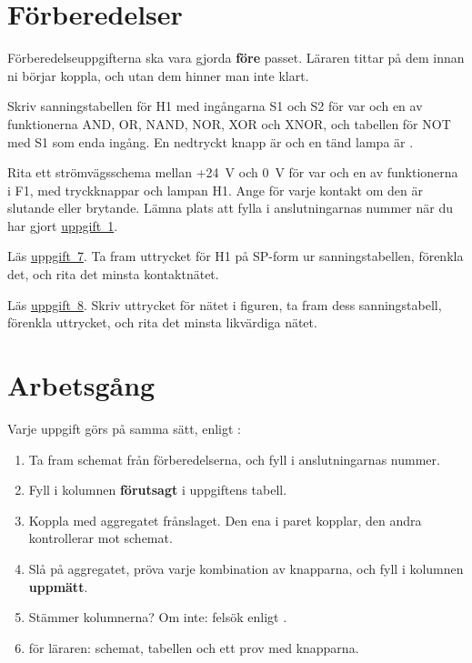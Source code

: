 \section{Förberedelser}
\label{lab1:sec:prep}
Förberedelseuppgifterna ska vara gjorda \textbf{före} passet. Läraren tittar på dem innan ni börjar
koppla, och utan dem hinner man inte klart.

Skriv sanningstabellen för H1 med ingångarna S1 och S2 för var och en av
funktionerna AND, OR, NAND, NOR, XOR och XNOR, och tabellen för NOT med S1 som enda ingång. En
nedtryckt knapp är  och en tänd lampa är .

Rita ett strömvägsschema mellan +24~V och 0~V för var och en av funktionerna
i F1, med tryckknappar och lampan H1. Ange för varje kontakt om den är slutande eller brytande.
Lämna plats att fylla i anslutningarnas nummer när du har gjort \hyperref[lab1:u1]{uppgift~1}.

Läs \hyperref[lab1:u7]{uppgift~7}. Ta fram uttrycket för H1 på SP-form ur
sanningstabellen, förenkla det, och rita det minsta kontaktnätet.

Läs \hyperref[lab1:u8]{uppgift~8}. Skriv uttrycket för nätet i figuren, ta
fram dess sanningstabell, förenkla uttrycket, och rita det minsta likvärdiga nätet.

\section{Arbetsgång}
\label{lab1:sec:procedure}
Varje uppgift görs på samma sätt, enligt :
\begin{enumerate}
  \item Ta fram schemat från förberedelserna, och fyll i anslutningarnas nummer.
  \item Fyll i kolumnen \textbf{förutsagt} i uppgiftens tabell.
  \item Koppla med aggregatet frånslaget. Den ena i paret kopplar, den andra kontrollerar mot
    schemat.
  \item Slå på aggregatet, pröva varje kombination av knapparna, och fyll i kolumnen
    \textbf{uppmätt}.
  \item Stämmer kolumnerna? Om inte: felsök enligt .
  \item {} för läraren: schemat, tabellen och ett prov med knapparna.
\end{enumerate}

